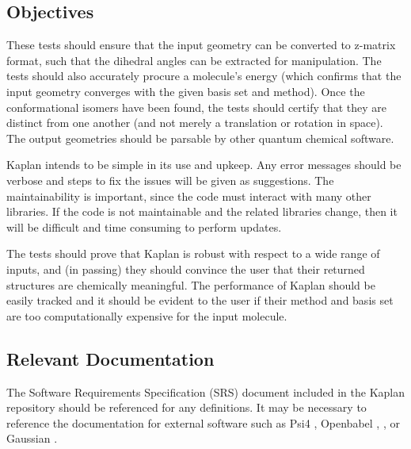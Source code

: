 \documentclass[12pt, titlepage]{article}
\newcommand{\progname}{Kaplan} %
\begin{document}
\subsection{Objectives}

These tests should ensure that the input geometry can be converted to z-matrix 
format, such that the dihedral angles can be extracted for manipulation. The 
tests should also accurately procure a molecule's energy (which confirms that 
the input geometry converges with the given basis set and method). Once the 
conformational isomers have been found, the tests should certify that they are 
distinct from one another (and not merely a translation or rotation in space). 
The output geometries should be parsable by other quantum chemical software.

\progname{} intends to be simple in its use and upkeep. Any error messages 
should be verbose and steps to fix the issues will be given as suggestions. The 
maintainability is important, since the code must interact with many other 
libraries. If the code is not maintainable and the related libraries change, 
then it will be difficult and time consuming to perform updates. 

The tests should prove that \progname{} is robust with respect to a wide range 
of inputs, and (in passing) they should convince the user that their returned 
structures are chemically meaningful. The performance of \progname{} should be 
easily tracked and it should be evident to the user if their method and basis 
set are too computationally expensive for the input molecule.


\subsection{Relevant Documentation}

The Software Requirements Specification (SRS) document included in the 
\progname{} repository should be referenced for any definitions. It may be 
necessary to reference the documentation for external software such as Psi4 
\cite{psi4}, Openbabel \cite{obabel}, \cite{obabel-web}, or Gaussian \cite{g16}.
\end{document}
